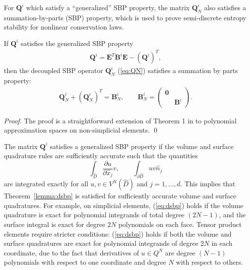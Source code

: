 \documentclass{svjour3}                     %
\renewcommand{\hat}{\widehat}
\newcommand{\pd}[2]{\frac{\partial#1}{\partial#2}}
\newcommand{\LRp}[1]{\left( #1 \right)}
\begin{document}
For $\bm{Q}^i$ which satisfy a ``generalized'' SBP property, the matrix $\bm{Q}^i_N$ also satisfies a summation-by-parts (SBP) property, which is used to prove semi-discrete entropy stability for nonlinear conservation laws.  
\begin{theorem}%
If $\bm{Q}^i$ satisfies the generalized SBP property
\begin{gather}
\bm{Q}^i = \bm{E}^T\bm{B}^i\bm{E} - \LRp{\bm{Q}^i}^T,
\label{eq:gsbp}
\end{gather}
then the decoupled SBP operator $\bm{Q}^i_N$ (\ref{eq:QN}) satisfies a summation by parts property:
\begin{gather}
\bm{Q}^i_N+\LRp{\bm{Q}^i_N}^T = \bm{B}^i_N, \qquad \bm{B}^i_N = \LRp{\begin{array}{cc}\bm{0}&\\ & \bm{B}^i\end{array}}.\label{eq:dsbp}
\end{gather}
\label{lemma:dsbp}
\end{theorem}
\begin{proof}
The proof is a straightforward extension of Theorem 1 in \cite{chan2017discretely} to polynomial approximation spaces on non-simplicial elements.  
\qed\end{proof}

The matrix $\bm{Q}^i$ satisfies a generalized SBP property if the volume and surface quadrature rules are sufficiently accurate such that the quantities
\[
\int_{\hat{D}} \pd{u}{\hat{x}_j} v, \qquad \int_{\partial \hat{D}} u v \hat{n}_j
\]
are integrated exactly for all $u,v \in V^N\LRp{\hat{D}}$ and $j = 1,\ldots, d$.  This implies that Theorem~\ref{lemma:dsbp} is satisfied for sufficiently accurate volume and surface quadratures.  For example, on simplicial elements, (\ref{eq:dsbp}) holds if the volume quadrature is exact for polynomial integrands of total degree $(2N-1)$, and the surface integral is exact for degree $2N$ polynomials on each face.  Tensor product elements require stricter conditions: (\ref{eq:dsbp}) holds if both the volume and surface quadratures are exact for polynomial integrands of degree $2N$ in each coordinate, due to the fact that derivatives of $u\in Q^N$ are degree $(N-1)$ polynomials with respect to one coordinate and degree $N$ with respect to others.  
\end{document}

